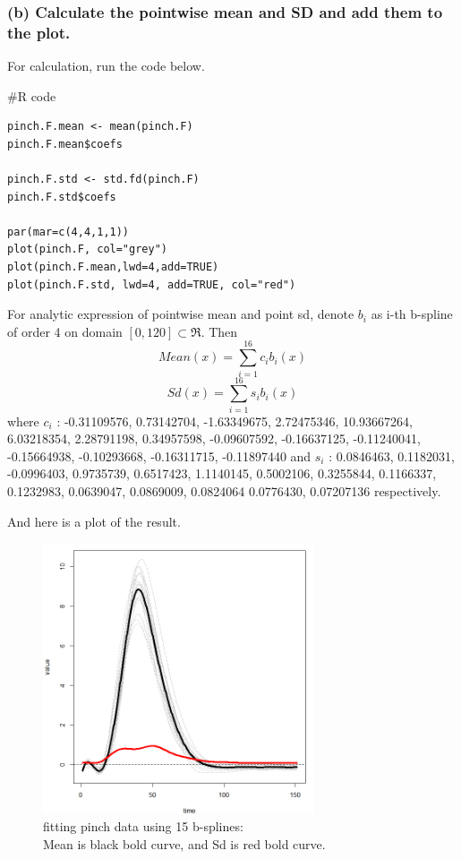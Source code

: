 \documentclass{article}
\newenvironment{Rcode}%
{%
    \begin{mdframed}
    \#R code
    \begin{small}
}
{%
    \end{small}
    \end{mdframed}
}
\begin{document}
\newpage
\subsubsection*{(b) Calculate the pointwise mean and SD and add them to the plot.}
For calculation, run the code below.
\begin{Rcode}
    \begin{verbatim}
pinch.F.mean <- mean(pinch.F)
pinch.F.mean$coefs

pinch.F.std <- std.fd(pinch.F)
pinch.F.std$coefs

par(mar=c(4,4,1,1))
plot(pinch.F, col="grey")
plot(pinch.F.mean,lwd=4,add=TRUE)
plot(pinch.F.std, lwd=4, add=TRUE, col="red")
    \end{verbatim}
\end{Rcode}

For analytic expression of pointwise mean and point sd, denote $b_i$ as i-th b-spline of order 4
on domain $[0,120] \subset \Re$. Then
\[Mean(x)=\sum_{i=1}^{16}c_ib_i(x)\]
\[Sd(x)=\sum_{i=1}^{16}s_ib_i(x)\]
where $c_i$ : -0.31109576, 0.73142704, -1.63349675, 2.72475346, 10.93667264, 6.03218354, 2.28791198, 0.34957598, -0.09607592, -0.16637125, -0.11240041, -0.15664938, -0.10293668, -0.16311715, -0.11897440
and $s_i$ : 0.0846463, 0.1182031, -0.0996403, 0.9735739, 0.6517423, 1.1140145, 0.5002106, 0.3255844, 0.1166337, 0.1232983, 0.0639047, 0.0869009, 0.0824064 0.0776430, 0.07207136
respectively. 

And here is a plot of the result.
\begin{figure}[hh]
    \centering
    \includegraphics[height=8cm]{pinch_F_mean_var_plot.png}
    \caption{fitting pinch data using 15 b-splines: \\ Mean is black bold curve, and Sd is red bold curve.}
\end{figure}
\end{document}

